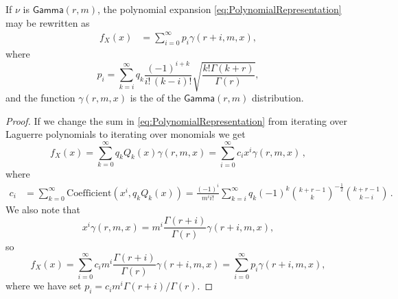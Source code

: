 \begin{lemma}\label{Lemma:PseudoMixtureOfGammas}
If $\nu$ is $\mathsf{Gamma}(r,m)$, the polynomial expansion \eqref{eq:PolynomialRepresentation}  may be rewritten as
\begin{align}\label{eq:PseudoMixtureOfGammas}
f_{X}(x)&= \sum_{i=0}^{\infty} p_i \gamma(r+i,m,x), %
\end{align}
where
\begin{equation}\label{eq:PiExpression}
p_i
=\sum_{k=i}^\infty q_k \frac{(-1)^{i+k}}{i! \, (k-i)!} \sqrt{\frac{k! \Gamma(k+r)}{\Gamma(r)}},
\end{equation}
and the function $\gamma(r,m,x)$ is the \pdf of the $\mathsf{Gamma}(r,m)$ distribution.

\end{lemma}
\begin{proof}
If we change the sum in \eqref{eq:PolynomialRepresentation} from iterating over Laguerre polynomials to iterating over monomials we get
\[
f_{X}(x)=\sum_{k=0}^{\infty} q_k Q_{k}(x) \gamma(r,m,x) = \sum_{i=0}^\infty c_i x^i \gamma(r,m,x) \, ,
\]
where
\begin{align*}
c_i
&= \sum_{k=0}^\infty \text{Coefficient}(x^i, q_k  Q_k(x)) %
= \frac{(-1)^i}{m^i i!} \sum_{k=i}^\infty q_k (-1)^{k} \binom{k + r - 1}{k}^{-\frac12} \binom{k + r - 1}{k - i} \,.
\end{align*}
We also note that
\[ x^i \gamma(r, m, x) = m^i \frac{\Gamma(r+i)}{\Gamma(r)} \gamma(r+i, m, x), \]
so
\[ f_{X}(x) = \sum_{i=0}^\infty c_i m^i \frac{\Gamma(r+i)}{\Gamma(r)} \gamma(r+i, m, x) =  \sum_{i=0}^\infty p_i \gamma(r+i, m, x),  \]
where we have set $p_i = c_i m^i \Gamma(r+i) / \Gamma(r)$.
\end{proof}

